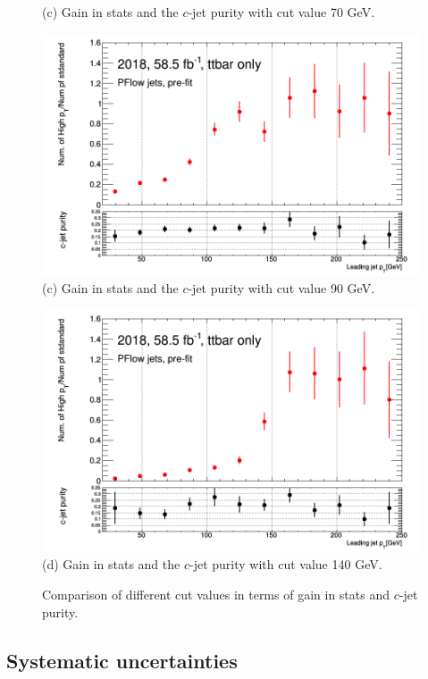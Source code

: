 \documentclass[letterpaper,12pt]{article}
\begin{document}
\begin{figure}
\begin{minipage}[b]{.45\textwidth}
\footnotesize (c) Gain in stats and the $c$-jet purity with cut value 70 GeV.
\end{minipage}\hfill
\begin{minipage}[b]{.45\textwidth}
\centering
\includegraphics[width=1\textwidth]{stat_gains/statsgain_90GeV.png}
\footnotesize (c) Gain in stats and the $c$-jet purity with cut value 90 GeV.
\end{minipage}\hfill
\begin{minipage}[b]{.45\textwidth}
\centering
\includegraphics[width=1\textwidth]{stat_gains/statsgain_140GeV.png}
\footnotesize (d) Gain in stats and the $c$-jet purity with cut value 140 GeV.
\end{minipage}\hfill

\caption{Comparison of different cut values in terms of gain in stats and $c$-jet purity.}
\label{fig:cutvalue}
\end{figure}


\subsection{Systematic uncertainties}
\end{document}
